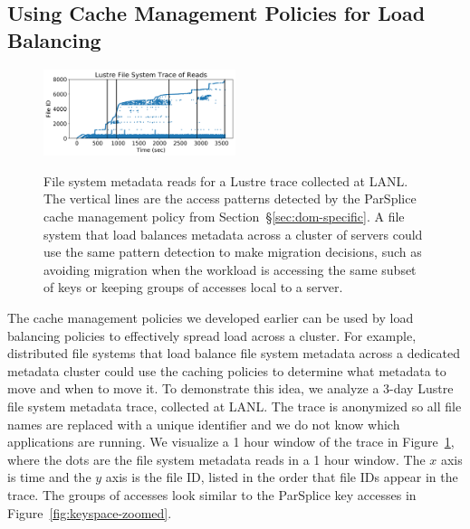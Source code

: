 \subsection{Using Cache Management Policies for Load Balancing}

\begin{figure}[t]
\noindent\includegraphics[width=0.5\textwidth]{./chapters/controlplane/parsplice/figures/trace-atime.png}\\
\caption{File system metadata reads for a Lustre trace collected at LANL. The
vertical lines are the access patterns detected by the ParSplice cache
management policy from Section~\S\ref{sec:dom-specific}. A file system that
load balances metadata across a cluster of servers could use the same pattern
detection to make migration decisions, such as avoiding migration when the
workload is accessing the same subset of keys or keeping groups of accesses
local to a server.  \label{fig:trace-atime}}
\end{figure}


The cache management policies we developed earlier can be used by load
balancing policies to effectively spread load across a cluster. For example,
distributed file systems that load balance file system metadata across a
dedicated metadata cluster could use the caching policies to determine what
metadata to move and when to move it.  To demonstrate this idea, we analyze a
3-day Lustre file system metadata trace, collected at LANL.  The trace is
anonymized so all file names are replaced with a unique identifier and we do
not know which applications are running. We visualize a 1 hour window of the
trace in Figure~\ref{fig:trace-atime}, where the dots are the file system
metadata reads in a 1 hour window.  The \(x\) axis is time and the \(y\) axis
is the file ID, listed in the order that file IDs appear in the trace.  The
groups of accesses look similar to the ParSplice key accesses in
Figure~\ref{fig:keyspace-zoomed}. 


